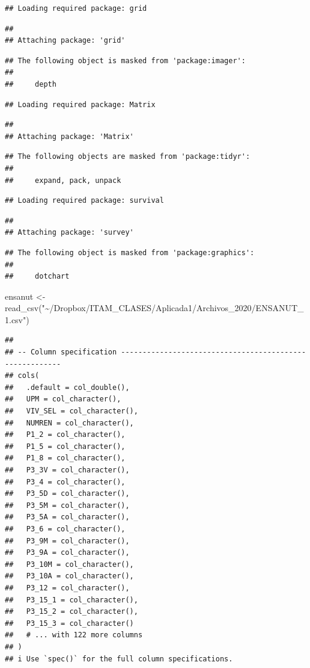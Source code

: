 \documentclass[
]{book}
\newenvironment{Shaded}{\begin{snugshade}}{\end{snugshade}}
\newcommand{\FunctionTok}[1]{\textcolor[rgb]{0.00,0.00,0.00}{#1}}
\newcommand{\NormalTok}[1]{#1}
\newcommand{\OtherTok}[1]{\textcolor[rgb]{0.56,0.35,0.01}{#1}}
\newcommand{\StringTok}[1]{\textcolor[rgb]{0.31,0.60,0.02}{#1}}
\begin{document}
\begin{verbatim}
## Loading required package: grid
\end{verbatim}

\begin{verbatim}
## 
## Attaching package: 'grid'
\end{verbatim}

\begin{verbatim}
## The following object is masked from 'package:imager':
## 
##     depth
\end{verbatim}

\begin{verbatim}
## Loading required package: Matrix
\end{verbatim}

\begin{verbatim}
## 
## Attaching package: 'Matrix'
\end{verbatim}

\begin{verbatim}
## The following objects are masked from 'package:tidyr':
## 
##     expand, pack, unpack
\end{verbatim}

\begin{verbatim}
## Loading required package: survival
\end{verbatim}

\begin{verbatim}
## 
## Attaching package: 'survey'
\end{verbatim}

\begin{verbatim}
## The following object is masked from 'package:graphics':
## 
##     dotchart
\end{verbatim}

\begin{Shaded}
\begin{Highlighting}[]
\NormalTok{ensanut }\OtherTok{\textless{}{-}} \FunctionTok{read\_csv}\NormalTok{(}\StringTok{"\textasciitilde{}/Dropbox/ITAM\_CLASES/Aplicada1/Archivos\_2020/ENSANUT\_1.csv"}\NormalTok{)}
\end{Highlighting}
\end{Shaded}

\begin{verbatim}
## 
## -- Column specification --------------------------------------------------------
## cols(
##   .default = col_double(),
##   UPM = col_character(),
##   VIV_SEL = col_character(),
##   NUMREN = col_character(),
##   P1_2 = col_character(),
##   P1_5 = col_character(),
##   P1_8 = col_character(),
##   P3_3V = col_character(),
##   P3_4 = col_character(),
##   P3_5D = col_character(),
##   P3_5M = col_character(),
##   P3_5A = col_character(),
##   P3_6 = col_character(),
##   P3_9M = col_character(),
##   P3_9A = col_character(),
##   P3_10M = col_character(),
##   P3_10A = col_character(),
##   P3_12 = col_character(),
##   P3_15_1 = col_character(),
##   P3_15_2 = col_character(),
##   P3_15_3 = col_character()
##   # ... with 122 more columns
## )
## i Use `spec()` for the full column specifications.
\end{verbatim}
\end{document}
